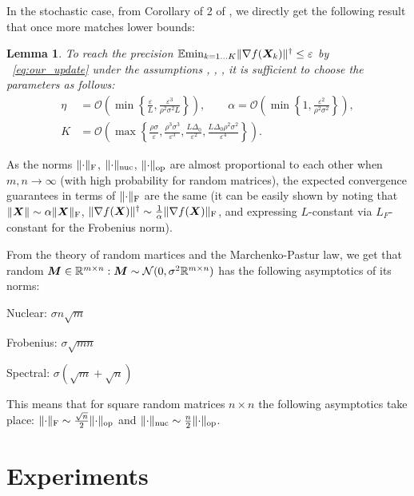 \documentclass{article} %
\newtheorem{lemma}{Lemma}
\newcommand{\norm}[1]{\lVert #1\rVert}
\renewcommand{\epsilon}{\varepsilon}
\newcommand{\Rmn}{\R^{m\times n}}
\newcommand{\cN}{\mathcal{N}}
\newcommand{\cO}{\mathcal{O}}
\DeclarePairedDelimiter{\normf}{\|}{\|_\mathrm{F}}
\DeclarePairedDelimiter{\norms}{\|}{\|_{\mathrm{op}}}
\DeclarePairedDelimiter{\normn}{\|}{\|_{\mathrm{nuc}}}
\begin{document}
    In the stochastic case, from Corollary of 2 of \citet{kovalev2025understanding}, we directly get the following result that once more matches lower bounds:

    \begin{lemma}\label{lemma:stoch_tr}
    To reach the precision $\E{\min_{k=1\ldots K} \norm{\nabla f(\mX_k)}^\dagger} \leq \epsilon$ by ~\eqref{eq:our_update} under the assumptions , , , it is sufficient to choose the parameters as follows:
    \begin{align}
        \eta &= \cO\left(\min\left\{\frac{\epsilon}{L}, \frac{\epsilon^3}{\rho^2\sigma^2L}\right\}\right),
        \qquad
        \alpha = \cO\left(\min\left\{1, \frac{\epsilon^2}{\rho^2\sigma^2}\right\}\right),
        \\
        \label{eq:str_K_nonconvex}
        K &= \cO\left(\max\left\{
            \frac{\rho\sigma}{\epsilon},
            \frac{\rho^3\sigma^3}{\epsilon^3},
            \frac{L\Delta_0}{\epsilon^2},
            \frac{L\Delta_0\rho^2\sigma^2}{\epsilon^4}
        \right\}\right).
    \end{align}
    \end{lemma}

    As the norms $\normf{\cdot}$, $\normn{\cdot}$, $\norms{\cdot}$ are almost proportional to each other when $m, n \rightarrow \infty$ (with high probability for random matrices), the expected convergence guarantees in terms of $\normf{\cdot}$ are the same (it can be easily shown by noting that $\norm{\mX}\sim\alpha\normf{\mX}$, $\norm{\nabla f(\mX)}^\dagger \sim \frac{1}{\alpha} \normf{\nabla f(\mX)}$, and expressing $L$-constant via $L_F$-constant for the Frobenius norm).

    From the theory of random martices and the Marchenko-Pastur law, we get that random $\mM \in \Rmn: \mM \sim \cN(0, \sigma^2 \Rmn)$ has the following asymptotics of its norms:

    Nuclear: $\sigma n \sqrt{m}$

    Frobenius: $\sigma \sqrt{m n}$
    
    Spectral: $\sigma(\sqrt{m} + \sqrt{n})$

    This means that for square random matrices $n \times n$  the following asymptotics take place: $\normf{\cdot} \sim \frac{\sqrt{n}}{2}\norms{\cdot}$ and $\normn{\cdot} \sim \frac{n}{2}\norms{\cdot}$.


\section{Experiments}
\end{document}
